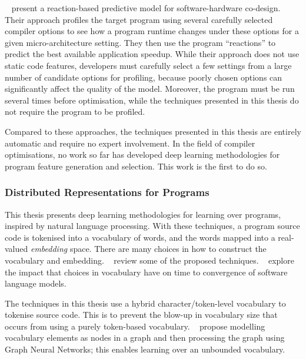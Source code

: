 \citeauthor{Cavazos2006}~\cite{Cavazos2006} present a reaction-based predictive model for software-hardware co-design. Their approach profiles the target program using several carefully selected compiler options to see how a program runtime changes under these options for a given micro-architecture setting. They then use the program ``reactions'' to predict the best available application speedup. While their approach does not use static code features, developers must carefully select a few settings from a large number of candidate options for profiling, because poorly chosen options can significantly affect the quality of the model. Moreover, the program must be run several times before optimisation, while the techniques presented in this thesis do not require the program to be profiled.

Compared to these approaches, the techniques presented in this thesis are entirely automatic and require no expert involvement. In the field of compiler optimisations, no work so far has developed deep learning methodologies for program feature generation and selection. This work is the first to do so.


\subsubsection{Distributed Representations for Programs}

This thesis presents deep learning methodologies for learning over programs, inspired by natural language processing. With these techniques, a program source code is tokenised into a vocabulary of words, and the words mapped into a real-valued \emph{embedding} space.
There are many choices in how to construct the vocabulary and embedding. \citeauthor{Chen2019}~\cite{Chen2019} review some of the proposed techniques.
\citeauthor{Babii}~\cite{Babii} explore the impact that choices in vocabulary have on time to convergence of software language models.

The techniques in this thesis use a hybrid character/token-level vocabulary to tokenise source code. This is to prevent the blow-up in vocabulary size that occurs from using a purely token-based vocabulary. \citeauthor{Cvitkovic2018a}~\cite{Cvitkovic2018a} propose modelling vocabulary elements as nodes in a graph and then processing the graph using Graph Neural Networks; this enables learning over an unbounded vocabulary.

